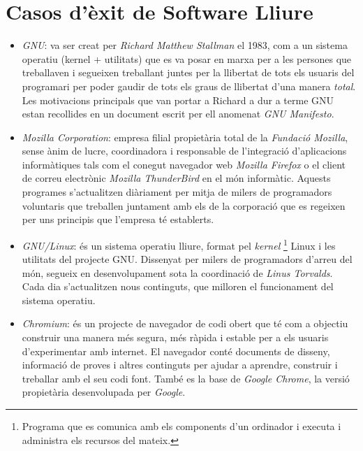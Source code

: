 \section{Casos d'èxit de Software Lliure}

\begin{itemize}

\item \emph{GNU}: va ser creat per \emph{Richard Matthew Stallman} el 1983, com a un sistema operatiu (kernel + utilitats) que es va posar en marxa per a les persones que treballaven i segueixen treballant juntes per la llibertat de tots els usuaris del programari per poder gaudir de tots els graus de llibertat d'una manera \emph{total}. Les motivacions principals que van portar a Richard a dur a terme GNU estan recollides en un document escrit per ell anomenat \emph{GNU Manifesto}. \cite{GNUExit} \cite{GNUExitII} \cite{GNUMan} \cite{GvsM}

\item \emph{Mozilla Corporation}: empresa filial propietària total de la \emph{Fundació Mozilla}, sense ànim de lucre, coordinadora i responsable de l'integració d'aplicacions informàtiques tals com el conegut navegador web \emph{Mozilla Firefox} o el client de correu electrònic \emph{Mozilla ThunderBird} en el món informàtic. Aquests programes s'actualitzen diàriament per mitja de milers de programadors voluntaris que treballen juntament amb els de la corporació que es regeixen per uns principis que l'empresa té establerts. \cite{MozExit} \cite{MozExitII} \cite{MozFesto}

\item \emph{GNU/Linux}: és un sistema operatiu lliure, format pel \emph{kernel} \footnote{Programa que es comunica amb els components d'un ordinador i executa i administra els recursos del mateix.} Linux i les utilitats del projecte GNU. Dissenyat per milers de programadors d'arreu del món, segueix en desenvolupament sota la coordinació de \emph{Linus Torvalds}. Cada dia s'actualitzen nous continguts, que milloren el funcionament del sistema operatiu. \cite{LinExit} \cite{POSIX}

\item \emph{Chromium}: és un projecte de navegador de codi obert que té com a objectiu construir una manera més segura, més ràpida i estable per a els usuaris d'experimentar amb internet. El navegador conté documents de disseny, informació de proves i altres continguts per ajudar a aprendre, construir i treballar amb el seu codi font. També es la base de \emph{Google Chrome}, la versió propietària desenvolupada per \emph{Google}. \cite{Chrom} 
\end{itemize}












